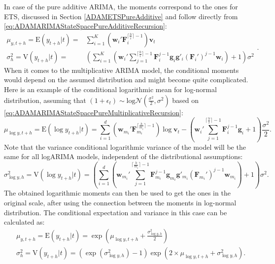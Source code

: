 \documentclass[
]{book}
\theoremstyle{definition}
\theoremstyle{definition}
\theoremstyle{definition}
\theoremstyle{definition}
\theoremstyle{remark}
\begin{document}
In case of the pure additive ARIMA, the moments correspond to the ones for ETS, discussed in Section \ref{ADAMETSPureAdditive} and follow directly from \eqref{eq:ADAMARIMAStateSpacePureAdditiveRecursion}:
\begin{equation*}
  \begin{aligned}
    \mu_{y,t+h} = \mathrm{E}(y_{t+h}|t) = & \sum_{i=1}^K \left(\mathbf{w}_{i}' \mathbf{F}_{i}^{\lceil\frac{h}{i}\rceil-1} \right) \mathbf{v}_{t} \\
    \sigma^2_{h} = \mathrm{V}(y_{t+h}|t) = & \left( \sum_{i=1}^K \left(\mathbf{w}_{i}' \sum_{j=1}^{\lceil\frac{h}{i}\rceil-1} \mathbf{F}_{i}^{j-1} \mathbf{g}_{i} \mathbf{g}'_{i} (\mathbf{F}_{i}')^{j-1} \mathbf{w}_{i} \right) + 1 \right) \sigma^2
  \end{aligned} .
\end{equation*}
When it comes to the multiplicative ARIMA model, the conditional moments would depend on the assumed distribution and might become quite complicated. Here is an example of the conditional logarithmic mean for log-normal distribution, assuming that \((1+\epsilon_t) \sim \mathrm{log}\mathcal{N}\left(\frac{\sigma^2}{2},\sigma^2 \right)\) based on \eqref{eq:ADAMARIMAStateSpacePureMultiplicativeRecursion}:
\begin{equation}
    \mu_{\log y,t+h} = \mathrm{E}(\log y_{t+h}|t) = \sum_{i=1}^d \left(\mathbf{w}_{m_i}' \mathbf{F}_{m_i}^{\lceil\frac{h}{m_i}\rceil-1} \right) \log \mathbf{v}_{t} -\left(\mathbf{w}_{i}' \sum_{j=1}^{\lceil\frac{h}{i}\rceil-1} \mathbf{F}_{i}^{j-1} \mathbf{g}_{i} + 1\right) \frac{\sigma^2}{2} .
  \label{eq:ADAMARIMAMultiplicativeMeanLogN}
\end{equation}
Note that the variance conditional logarithmic variance of the model will be the same for all logARIMA models, independent of the distributional assumptions:
\begin{equation}
    \sigma^2_{\log y,h} = \mathrm{V}(\log y_{t+h}|t) = \left( \sum_{i=1}^d \left(\mathbf{w}_{m_i}' \sum_{j=1}^{\lceil\frac{h}{m_i}\rceil-1} \mathbf{F}_{m_i}^{j-1} \mathbf{g}_{m_i} \mathbf{g}'_{m_i} (\mathbf{F}_{m_i}')^{j-1} \mathbf{w}_{m_i} \right) + 1 \right) \sigma^2 .
  \label{eq:ADAMARIMAMultiplicativeVarianceLogN}
\end{equation}
The obtained logarithmic moments can then be used to get the ones in the original scale, after using the connection between the moments in log-normal distribution. The conditional expectation and variance in this case can be calculated as:
\begin{equation}
  \begin{aligned}
    & \mu_{y,t+h} = \mathrm{E}(y_{t+h}|t) = \exp \left(\mu_{\log y,t+h} + \frac{\sigma^2_{\log y,h}}{2} \right) \\
    & \sigma^2_{h} = \mathrm{V}(y_{t+h}|t) = \left(\exp\left( \sigma^2_{\log y,h} \right) -1 \right)\exp\left(2 \times \mu_{\log y,t+h} + \sigma^2_{\log y,h} \right) .
  \end{aligned}
  \label{eq:ADAMARIMAMultiplicativeMomentsLogN}
\end{equation}
\end{document}
